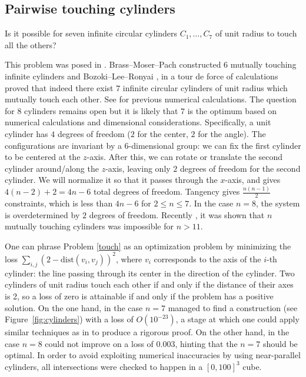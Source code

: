 \subsection{Pairwise touching cylinders}

\renewcommand{\problemURL}{https://google-deepmind.github.io/alphaevolve_repository_of_problems/problems/54.html}

\begin{problem}\label{touch}  Is it possible for seven infinite circular cylinders $C_1,\dots,C_7$ of unit radius to touch all the others?
\end{problem}

This problem was posed in \cite[Problem 7]{littlewood1968}. Brass--Moser--Pach \cite[page 98]{brass2005} constructed $6$ mutually touching infinite cylinders and Bozoki--Lee--Ronyai \cite{bozoki2014}, in a tour de force of calculations proved that indeed there exist $7$ infinite circular cylinders of unit radius which mutually touch each other. See \cite{pikhitsa2004,pikhitsa2009} for previous numerical calculations. The question for $8$ cylinders remains open \cite{bezdek2005} but it is likely that $7$ is the optimum based on numerical calculations and dimensional considerations. Specifically, a unit cylinder has $4$ degrees of freedom ($2$ for the center, $2$ for the angle).  The configurations are invariant by a $6$-dimensional group: we can fix the first cylinder to be centered at the $z$-axis. After this, we can rotate or translate the second cylinder around/along the $z$-axis, leaving only $2$ degrees of freedom for the second cylinder. We will normalize it so that it passes through the $x$-axis, and  gives $4(n-2)+2 = 4n-6$ total degrees of freedom.  Tangency gives $\frac{n(n-1)}{2}$ constraints, which is less than $4n-6$ for $2 \leq n \leq 7$. In the case $n = 8$, the system is overdetermined by $2$ degrees of freedom.  Recently \cite{dillon}, it was shown that $n$ mutually touching cylinders was impossible for $n > 11$.

One can phrase Problem \ref{touch} as an optimization problem by minimizing the loss $\sum_{i,j} (2 - \text{dist}(v_i,v_j))^2$, where $v_i$ corresponds to the axis of the $i$-th cylinder: the line passing through its center in the direction of the cylinder. Two cylinders of unit radius touch each other if and only if
the distance of their axes is 2, so a loss of zero is attainable if and only if the problem has a positive solution. On the one hand, in the case $n=7$ \AlphaEvolve managed to find a construction (see Figure~\ref{fig:cylinders}) with a loss of $O(10^{-23})$, a stage at which one could apply similar techniques as in \cite{bozoki2014,neumaier1990} to produce a rigorous proof. On the other hand, in the case $n=8$ \AlphaEvolve could not improve on a loss of 0.003, hinting that the $n=7$ should be optimal. In order to avoid exploiting numerical inaccuracies by using near-parallel cylinders, all intersections were checked to happen in a $[0,100]^3$ cube.

